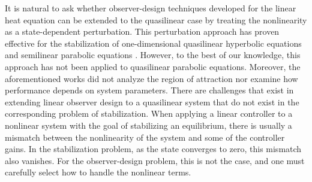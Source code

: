 \documentclass[twocolumn]{autart}
\begin{document}
It is natural to ask whether observer-design techniques developed for the linear heat equation can be extended to the quasilinear case by treating the nonlinearity as a state-dependent perturbation. This perturbation approach has proven effective for the stabilization of one-dimensional quasilinear hyperbolic equations \cite{coron} and semilinear parabolic equations \cite{semi}. However, to the best of our knowledge, this approach has not been applied to quasilinear parabolic equations. Moreover, the aforementioned works did not analyze the region of attraction nor examine how performance depends on system parameters. There are  challenges that exist in extending linear observer design to a quasilinear system  that do not exist in the corresponding problem of stabilization. When applying a linear controller to a nonlinear system with the goal of stabilizing an equilibrium, there is usually a mismatch between the nonlinearity of the system and some of the controller gains. In the stabilization problem, as the state converges to zero, this mismatch also vanishes. For the observer-design problem, this is not the case, and one must carefully select how to handle the nonlinear terms. 
\end{document}
